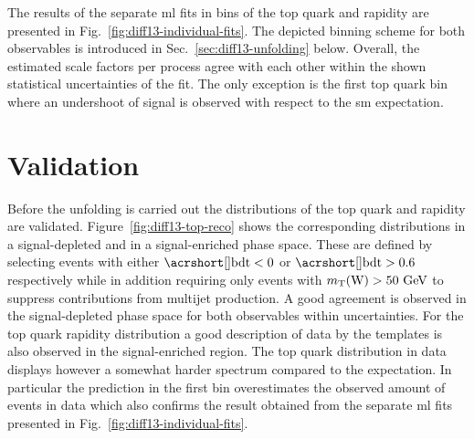 The results of the separate \gls{ml} fits in bins of the top quark \pt and rapidity are presented in Fig.~\ref{fig:diff13-individual-fits}. The depicted binning scheme for both observables is introduced in Sec.~\ref{sec:diff13-unfolding} below. Overall, the estimated scale factors per process agree with each other within the shown statistical uncertainties of the fit. The only exception is the first top quark \pt bin where an undershoot of signal is observed with respect to the \gls{sm} expectation.



\section{Validation}

Before the unfolding is carried out the distributions of the top quark \pt and rapidity are validated. Figure~\ref{fig:diff13-top-reco} shows the corresponding distributions in a signal-depleted and in a signal-enriched phase space. These are defined by selecting events with either $\bdt<0$ or $\bdt>0.6$ respectively while in addition requiring only events with $m_{\textrm{T}}(\textrm{W})>50~\textrm{GeV}$ to suppress contributions from multijet production. A good agreement is observed in the signal-depleted phase space for both observables within uncertainties. For the top quark rapidity distribution a good description of data by the templates is also observed in the signal-enriched region. The top quark \pt distribution in data displays however a somewhat harder spectrum compared to the expectation. In particular the prediction in the first \pt bin overestimates the observed amount of events in data which also confirms the result obtained from the separate \gls{ml} fits presented in Fig.~\ref{fig:diff13-individual-fits}.

